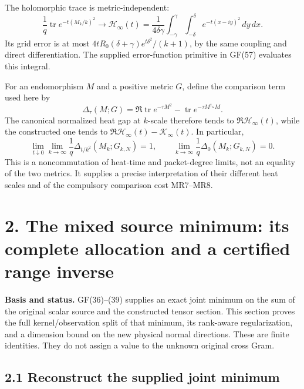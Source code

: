 \documentclass[
  11pt,
]{article}
\begin{document}
The holomorphic trace is metric-independent: \[
\frac1q\operatorname{tr}e^{-t(M_k/k)^2}\to
\mathcal H_\infty(t)=\frac1{4\delta\gamma}
\int_{-\gamma}^{\gamma}\int_{-\delta}^{\delta}e^{-t(x-iy)^2}\,dy\,dx.
\tag{MR13}
\] Its grid error is at most
\(4tR_0(\delta+\gamma)e^{t\delta^2}/(k+1)\), by the same coupling and
direct differentiation. The supplied error-function primitive in GF(57)
evaluates this integral.

For an endomorphism \(M\) and a positive metric \(G\), define the
comparison term used here by \[
\Delta_\tau(M;G)=\Re\operatorname{tr}e^{-\tau M^2}
-\operatorname{tr}e^{-\tau M^{\dagger_G}M}.
\] The canonical normalized heat gap at \(k\)-scale therefore tends to
\(\Re\mathcal H_\infty(t)\), while the constructed one tends to
\(\Re\mathcal H_\infty(t)-\mathcal K_\infty(t)\). In particular, \[
\lim_{t\downarrow0}\lim_{k\to\infty}\frac1q\Delta_{t/k^2}(M_k;G_{k,N})=1,
\qquad
\lim_{k\to\infty}\frac1q\Delta_0(M_k;G_{k,N})=0.
\tag{MR14}
\] This is a noncommutation of heat-time and packet-degree limits, not
an equality of the two metrics. It supplies a precise interpretation of
their different heat scales and of the compulsory comparison cost
MR7--MR8.

\newpage

\section{2. The mixed source minimum: its complete allocation and a
certified range
inverse}\label{the-mixed-source-minimum-its-complete-allocation-and-a-certified-range-inverse}

\textbf{Basis and status.} GF(36)--(39) supplies an exact joint minimum
on the sum of the original scalar source and the constructed tensor
section. This section proves the full kernel/observation split of that
minimum, its rank-aware regularization, and a dimension bound on the new
physical normal directions. These are finite identities. They do not
assign a value to the unknown original cross Gram.

\subsection{2.1 Reconstruct the supplied joint
minimum}\label{reconstruct-the-supplied-joint-minimum}
\end{document}
